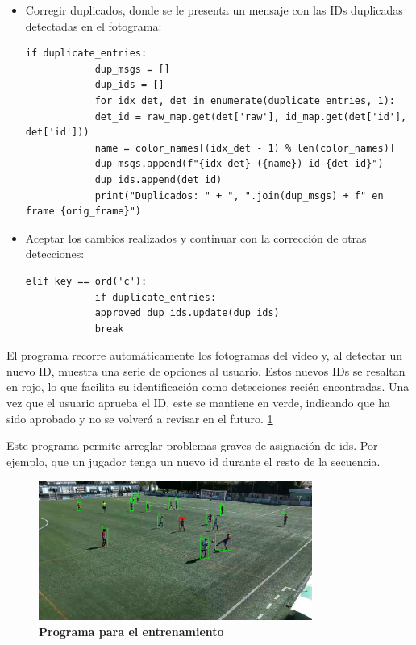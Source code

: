 \documentclass[12pt, a4paper, twoside]{article}
\begin{document}
\begin{itemize}
		\item Corregir duplicados, donde se le presenta un mensaje con las IDs duplicadas detectadas en el fotograma:
		\vspace{0.5cm}
		\begin{lstlisting}[style=pythonstyle]
			if duplicate_entries:
			dup_msgs = []
			dup_ids = []
			for idx_det, det in enumerate(duplicate_entries, 1):
			det_id = raw_map.get(det['raw'], id_map.get(det['id'], det['id']))
			name = color_names[(idx_det - 1) % len(color_names)]
			dup_msgs.append(f"{idx_det} ({name}) id {det_id}")
			dup_ids.append(det_id)
			print("Duplicados: " + ", ".join(dup_msgs) + f" en frame {orig_frame}")
		\end{lstlisting}
		
		\item Aceptar los cambios realizados y continuar con la corrección de otras detecciones:
		\vspace{0.5cm}
		\begin{lstlisting}[style=pythonstyle]
			elif key == ord('c'):
			if duplicate_entries:
			approved_dup_ids.update(dup_ids)
			break
		\end{lstlisting}
	\end{itemize}
	
	
	El programa recorre automáticamente los fotogramas del video y, al detectar un nuevo ID, muestra una serie de opciones al usuario. Estos nuevos IDs se resaltan en rojo, lo que facilita su identificación como detecciones recién encontradas. Una vez que el usuario aprueba el ID, este se mantiene en verde, indicando que ha sido aprobado y no se volverá a revisar en el futuro. \ref{entr_reid}
	
	Este programa permite arreglar problemas graves de asignación de ids. Por ejemplo, que un jugador tenga un nuevo id durante el resto de la secuencia.
	
	\begin{figure}[H]
		\centering
		\includegraphics[width=0.8\textwidth]{image/entr_reid}
		\caption{\textbf{Programa para el entrenamiento}}
		\label{entr_reid}
	\end{figure}
	
\end{document}
